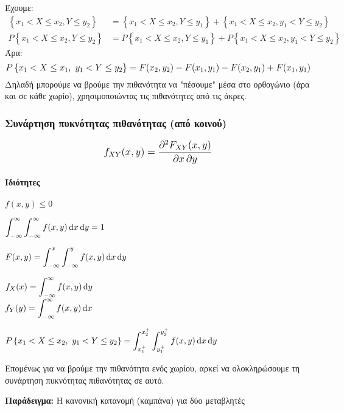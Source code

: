 \documentclass[11pt,a4paper,notitlepage,fleqn,final]{article}
\begin{document}
	Έχουμε:
	\begin{align*}
	\left\lbrace x_1<X\leq x_2,Y\leq y_2 \right\rbrace
	&= \left\lbrace x_1<X\leq x_2, Y\leq y_1 \right\rbrace
	+ \left\lbrace x_1<X\leq x_2,y_1<Y\leq y_2 \right\rbrace
	\\
	P\left\lbrace x_1<X\leq x_2,Y\leq y_2 \right\rbrace
	&= P\left\lbrace x_1<X\leq x_2, Y\leq y_1 \right\rbrace
	+ P \left\lbrace x_1<X\leq x_2,y_1<Y\leq y_2 \right\rbrace
	\end{align*}
	Άρα:
	\[
	\mathlarger{
		P \left\lbrace x_1<X\leq x_1,\ y_1<Y\leq y_2 \right\rbrace
		= F(x_2,y_2) - F(x_1,y_1) - F(x_2,y_1) + F(x_1,y_1)
	}
	\]
	Δηλαδή μπορούμε να βρούμε την πιθανότητα να "πέσουμε" μέσα στο
	ορθογώνιο (άρα και σε κάθε χωρίο), χρησιμοποιώντας τις 
	πιθανότητες από τις άκρες.
	
	\subsubsection{Συνάρτηση πυκνότητας πιθανότητας (από κοινού)}
	\[
	\mathlarger{f_{XY}(x,y)
			= \frac{\partial^2 F_{XY}(x,y)}{\partial x\,\partial y}
			}
	\]
	
	\paragraph{Ιδιότητες}
	\begin{enumroman}
		\item \( f(x,y) \leq 0 \)
		\item \( \displaystyle
		\int_{-\infty}^{\infty} \int_{-\infty}^{\infty} f(x,y)\mathop{}\!\mathrm{d} x
		\mathop{}\!\mathrm{d} y = 1
		 \)
		\item \( \displaystyle
		F(x,y) = \int_{-\infty}^{x}\int_{-\infty}^{y} f(x,y)\mathop{}\!\mathrm{d} x\mathop{}\!\mathrm{d} y
		 \)
		\item \( \displaystyle
		f_X(x) = \int_{-\infty}^{\infty} f(x,y)\mathop{}\!\mathrm{d} y \) \\
		\( \displaystyle
		f_Y(y) = \int_{-\infty}^{\infty} f(x,y)\mathop{}\!\mathrm{d} x \)
		\item \( \displaystyle
		P\left\lbrace x_1<X\leq x_2,\ y_1<Y\leq y_2 \right\rbrace
		= \int_{x_1^+}^{x_2^+} \int_{y_1^+}^{y_2^+} f(x,y)\mathop{}\!\mathrm{d} x\mathop{}\!\mathrm{d} y
		 \)
	\end{enumroman}
	
	Επομένως για να βρούμε την πιθανότητα ενός χωρίου, αρκεί να
	ολοκληρώσουμε τη συνάρτηση πυκνότητας πιθανότητας σε αυτό.
	
	\textbf{Παράδειγμα:} Η κανονική κατανομή (καμπάνα)
	για δύο μεταβλητές
	
\end{document}
